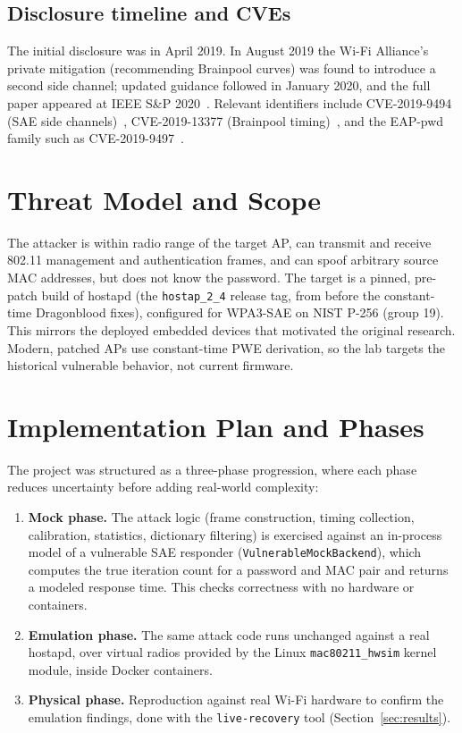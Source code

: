 \documentclass[11pt,letterpaper]{article}
\newcommand{\code}[1]{\texttt{\small #1}}
\begin{document}
\subsection{Disclosure timeline and CVEs}
The initial disclosure was in April 2019. In August 2019 the Wi-Fi Alliance's
private mitigation (recommending Brainpool curves) was found to introduce a
second side channel; updated guidance followed in January 2020, and the full
paper appeared at IEEE S\&P 2020~\cite{vanhoef2020dragonblood}. Relevant
identifiers include CVE-2019-9494 (SAE side channels)~\cite{cve_2019_9494},
CVE-2019-13377 (Brainpool timing)~\cite{cve_2019_13377}, and the EAP-pwd family
such as CVE-2019-9497~\cite{cve_2019_9497}.

\section{Threat Model and Scope}
The attacker is within radio range of the target AP, can transmit and receive
802.11 management and authentication frames, and can spoof arbitrary source MAC
addresses, but does not know the password. The target is a pinned, pre-patch
build of hostapd (the \code{hostap\_2\_4} release tag, from before the
constant-time Dragonblood fixes), configured for WPA3-SAE on NIST P-256
(group 19). This mirrors the deployed embedded devices that motivated the
original research. Modern, patched APs use constant-time PWE derivation, so the
lab targets the historical vulnerable behavior, not current firmware.

\section{Implementation Plan and Phases}
\label{sec:phases}
The project was structured as a three-phase progression, where each phase
reduces uncertainty before adding real-world complexity:

\begin{enumerate}
  \item \textbf{Mock phase.} The attack logic (frame construction, timing
    collection, calibration, statistics, dictionary filtering) is exercised
    against an in-process model of a vulnerable SAE responder
    (\code{VulnerableMockBackend}), which computes the true iteration count for a
    password and MAC pair and returns a modeled response time. This checks
    correctness with no hardware or containers.
  \item \textbf{Emulation phase.} The same attack code runs unchanged against a
    real hostapd, over virtual radios provided by the Linux
    \code{mac80211\_hwsim} kernel module, inside Docker containers.
  \item \textbf{Physical phase.} Reproduction against real Wi-Fi hardware to
    confirm the emulation findings, done with the \code{live-recovery} tool
    (Section~\ref{sec:results}).
\end{enumerate}
\end{document}
